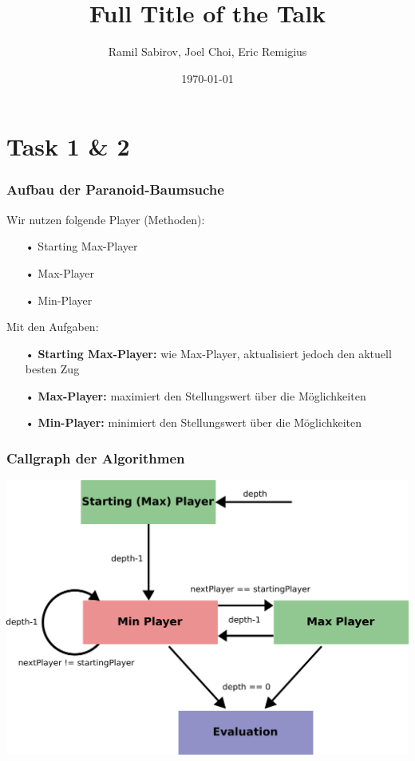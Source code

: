 \documentclass{beamer}
\title[Short title]{Full Title of the Talk} %
\author{Ramil Sabirov, Joel Choi, Eric Remigius} %
\institute[RWTH] %
{
RWTH Aachen \\ %
\medskip
\textit{Gruppe3} %
}
\date{\today} %
\begin{document}
\begin{frame}
\titlepage %
\end{frame}


\section{Task 1 & 2}

\begin{frame}
\frametitle{Aufbau der Paranoid-Baumsuche}
Wir nutzen folgende Player (Methoden):
\begin{enumerate}
\item[•] Starting Max-Player
\item[•] Max-Player
\item[•] Min-Player
\end{enumerate}\hfill\break
Mit den Aufgaben:
\begin{enumerate}
\item[•] \textbf{Starting Max-Player:} wie Max-Player, aktualisiert jedoch den aktuell besten Zug
\item[•] \textbf{Max-Player:} maximiert den Stellungswert über die Möglichkeiten
\item[•] \textbf{Min-Player:} minimiert den Stellungswert über die Möglichkeiten
\end{enumerate}

\end{frame}


\begin{frame}
\frametitle{Callgraph der Algorithmen}


\begin{center}
	\includegraphics[scale=0.2]{figures/MinMaxCallGraph.pdf}
\end{center}

\end{frame}
\end{document}

